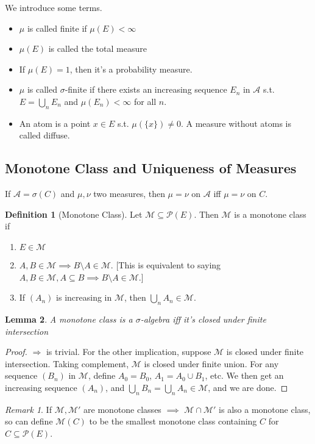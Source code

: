 \documentclass{article}
\theoremstyle{definition}
\newtheorem{defn}{Definition}[section]
\theoremstyle{remark}
\newtheorem{rem}{Remark}
\theoremstyle{plain}
\newtheorem{lem}[defn]{Lemma}
\begin{document}
We introduce some terms.
\begin{itemize}
    \item $\mu$ is called finite if $\mu(E)<\infty$
    \item $\mu(E)$ is called the total measure
    \item If $\mu(E)=1$, then it's a probability measure.
    \item $\mu$ is called $\sigma$-finite if there exists an increasing sequence $E_n$ in $\mathcal{A}$ s.t. $E=\bigcup_n E_n$ and $\mu(E_n)<\infty$ for all $n$.
    \item An atom is a point $x\in E$ s.t. $\mu(\{x\})\neq 0$. A measure without atoms is called diffuse.
\end{itemize}
\subsection{Monotone Class and Uniqueness of Measures}
If $\mathcal{A}=\sigma(C)$ and $\mu,\nu$ two measures, then $\mu=\nu$ on $\mathcal{A}$ iff $\mu=\nu$ on $C$.
\begin{defn}[Monotone Class]
Let $\mathcal{M}\subseteq\mathcal{P}(E)$. Then $\mathcal{M}$ is a monotone class if 
\begin{enumerate}
    \item $E\in\mathcal{M}$
    \item $A,B\in\mathcal{M}\implies B\setminus A\in\mathcal{M}$. [This is equivalent to saying $A,B\in\mathcal{M}, A\subseteq B\implies B\setminus A\in\mathcal{M}$.]
    \item If $(A_n)$ is increasing in $\mathcal{M}$, then $\bigcup_nA_n\in\mathcal{M}$.
\end{enumerate}
\end{defn}
\begin{lem}
    A monotone class is a $\sigma$-algebra iff it's closed under finite intersection
\end{lem}
\begin{proof}
    $\Rightarrow$ is trivial. For the other implication, suppose $\mathcal{M}$ is closed under finite intersection. Taking complement, $\mathcal{M}$ is closed under finite union. For any sequence $(B_n)$ in $\mathcal{M}$, define $A_0=B_0$, $A_1=A_0\cup B_1$, etc. We then get an increasing sequence $(A_n)$, and $\bigcup_n B_n=\bigcup_n A_n\in\mathcal{M}$, and we are done.
\end{proof}
\begin{rem}
    If $\mathcal{M},\mathcal{M'}$ are monotone classes $\implies$ $\mathcal{M}\cap\mathcal{M'}$ is also a monotone class, so can define $\mathcal{M}(C)$ to be the smallest monotone class containing $C$ for $C\subseteq\mathcal{P}(E)$.
\end{rem}
\end{document}
